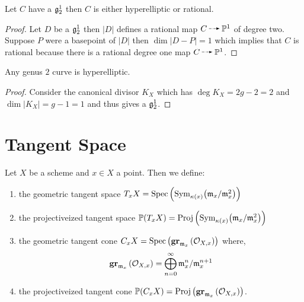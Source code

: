 \documentclass[12pt]{article}
\begin{document}
\begin{lemma}
Let $C$ have a $\mathfrak{g}^{1}_{2}$ then $C$ is either hyperelliptic or rational.
\end{lemma}

\begin{proof}
Let $D$ be a $\mathfrak{g}^{1}_{2}$ then $|D|$ defines a rational map $C \rat \P^1$ of degree two. Suppose $P$ were a basepoint of $|D|$ then $\dim |D - P| = 1$ which implies that $C$ is rational because there is a rational degree one map $C \rat \P^1$. 
\end{proof}

\begin{prop}
Any genus $2$ curve is hyperelliptic. 
\end{prop}

\begin{proof}
Consider the canonical divisor $K_X$ which has $\deg{K_X} = 2g - 2 = 2$ and $\dim{|K_X|} = g - 1 = 1$ and thus gives a $\mathfrak{g}^{1}_{2}$. 
\end{proof}

\section{Tangent Space}

\newcommand{\Bl}[2]{\mathrm{Bl}_{#1} \left( #2 \right)}

\begin{defn}
Let $X$ be a scheme and $x \in X$ a point. Then we define:
\begin{enumerate}
\item the geometric tangent space $T_x X = \mathrm{Spec}\left( \mathrm{Sym}_{\kappa(x)}\! \left( \mathfrak{m}_x / \mathfrak{m}_x^2 \right) \right)$
\item the projectiveized tangent space $\mathbb{P}(T_x X) = \mathrm{Proj}\left( \mathrm{Sym}_{\kappa(x)}\! \left( \mathfrak{m}_x / \mathfrak{m}_x^2 \right) \right)$
\item the geometric tangent cone $C_x X = \mathrm{Spec}\left( \mathbf{gr}_{\mathfrak{m}_x}\left(\mathcal{O}_{X, x}\right) \right)$ where,
\[ \mathbf{gr}_{\mathfrak{m}_x}\left(\mathcal{O}_{X, x}\right) = \bigoplus_{n = 0}^\infty \mathfrak{m}_x^n / \mathfrak{m}_x^{n+1} \]
\item the projectiveized tangent cone $\mathbb{P}(C_x X) = \mathrm{Proj}\left( \mathbf{gr}_{\mathfrak{m}_x}\left(\mathcal{O}_{X, x}\right) \right)$.
\end{enumerate}
\end{defn}
\end{document}
